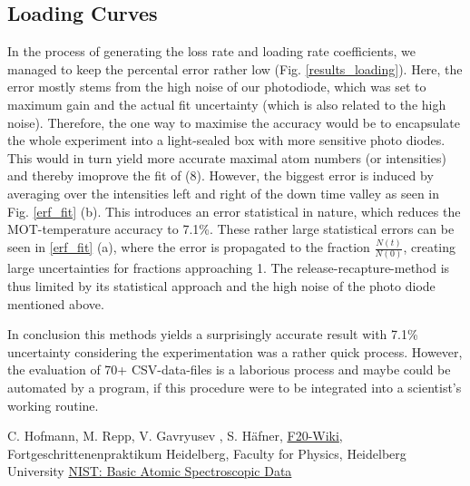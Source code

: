 \documentclass[12pt, a4paper]{article}
\begin{document}
\subsection{Loading Curves}
In the process of generating the loss rate and loading rate coefficients, we managed to keep the percental error rather low (Fig. \ref{results_loading}). Here, the error mostly stems from the high noise of our photodiode, which was set to maximum gain and the actual fit uncertainty (which is also related to the high noise). Therefore, the one way to maximise the accuracy would be to encapsulate the whole experiment into a light-sealed box with more sensitive photo diodes. This would in turn yield more accurate maximal atom numbers (or intensities) and thereby imoprove the fit of (8). However, the biggest error is induced by averaging over the intensities left and right of the down time valley as seen in Fig. \ref{erf_fit} (b). This introduces an error statistical in nature, which reduces the MOT-temperature accuracy to 7.1\%. These rather large statistical errors can be seen in \ref{erf_fit} (a), where the error is propagated to the fraction $\frac{N(t)}{N(0)}$, creating large uncertainties for fractions approaching 1. The release-recapture-method is thus limited by its statistical approach and the high noise of the photo diode mentioned above. 

In conclusion this methods yields a surprisingly accurate result with 7.1\% uncertainty considering the experimentation was a rather quick process. However, the evaluation of 70+ CSV-data-files is a laborious process and maybe could be automated by a program, if this procedure were to be integrated into a scientist's working routine.


























\newpage 



\begin{thebibliography}{00}   %
 C. Hofmann, M. Repp, V. Gavryusev , S. H\"afner, \href{https://www.physi.uni-heidelberg.de/Forschung/QD/f20wikinew/index.php/Main_Page}{F20-Wiki}, Fortgeschrittenenpraktikum Heidelberg, Faculty for Physics, Heidelberg University
 \href{https://physics.nist.gov/PhysRefData/Handbook/Tables/rubidiumtable1.htm}{NIST: Basic Atomic Spectroscopic Data}

\end{thebibliography}
\end{document}
